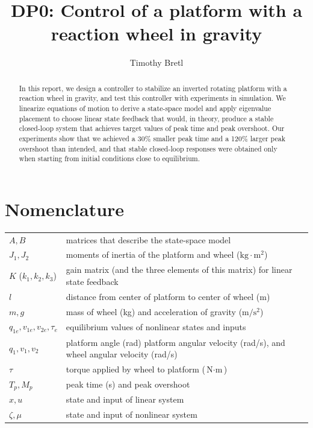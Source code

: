 \documentclass[conf]{new-aiaa}
\title{DP0: Control of a platform with a reaction wheel in gravity}
\author{Timothy Bretl}
\affil{University of Illinois at Urbana-Champaign}
\begin{document}
\maketitle

\begin{abstract}
In this report, we design a controller to stabilize an inverted rotating platform with a reaction wheel in gravity, and test this controller with experiments in simulation. We linearize equations of motion to derive a state-space model and apply eigenvalue placement to choose linear state feedback that would, in theory, produce a stable closed-loop system that achieves target values of peak time and peak overshoot. Our experiments show that we achieved a 30\% smaller peak time and a 120\% larger peak overshoot than intended, and that stable closed-loop responses were obtained only when starting from initial conditions close to equilibrium.
\end{abstract}

\section{Nomenclature}

{\renewcommand\arraystretch{1.0}
\noindent\begin{longtable*}{@{}l @{\quad=\quad} l@{}}
$A, B$ & matrices that describe the state-space model \\
$J_{1}, J_{2}$  & moments of inertia of the platform and wheel ($\text{kg}\cdot\text{m}^{2}$) \\
$K$ ($k_{1}, k_{2}, k_{3}$) & gain matrix (and the three elements of this matrix) for linear state feedback \\
$l$& distance from center of platform to center of wheel (m) \\
$m, g$ & mass of wheel (kg) and acceleration of gravity ($\text{m}/\text{s}^{2}$) \\
$q_{1e}, v_{1e}, v_{2e}, \tau_{e}$ & equilibrium values of nonlinear states and inputs \\
$q_{1}, v_{1}, v_{2}$ & platform angle (rad) platform angular velocity (rad/s), and wheel angular velocity (rad/s)\\
$\tau$ & torque applied by wheel to platform ($\text{N}\cdot\text{m}$) \\
$T_{p}, M_{p}$ & peak time (s) and peak overshoot \\
$x, u$ & state and input of linear system \\
$\zeta, \mu$ & state and input of nonlinear system \\
\end{longtable*}}
\end{document}
